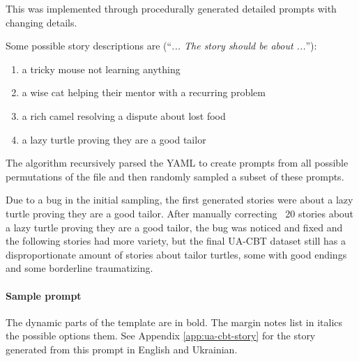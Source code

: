 This was implemented through procedurally generated detailed prompts with changing details. 

Some possible story descriptions are (``\textit{... The story should be about ...}''):
\begin{enumerate}
    \setlength{\itemsep}{0pt}
    \setlength{\parskip}{0pt}
    \item a tricky mouse not learning anything
    \item a wise cat helping their mentor with a recurring problem
    \item a rich camel resolving a dispute about lost food
    \item a lazy turtle proving they are a good tailor
\end{enumerate}
The algorithm recursively parsed the YAML to create prompts from all possible permutations of the file and then randomly sampled a subset of these prompts. 

Due to a bug in the initial sampling, the first generated stories were about a lazy turtle proving they are a good tailor. After manually correcting ~20 stories about a lazy turtle proving they are a good tailor, the bug was noticed and fixed and the following stories had more variety, 
but the final UA-CBT dataset still has a disproportionate amount of stories about tailor turtles, some with good endings and some borderline traumatizing.

\paragraph{Sample prompt}
\label{sec:ua-cbt-sample-prompt}
The dynamic parts of the template are in bold. The margin notes list in italics the possible options them.
See Appendix \ref{app:ua-cbt-story} for the story generated from this prompt in English and Ukrainian.



